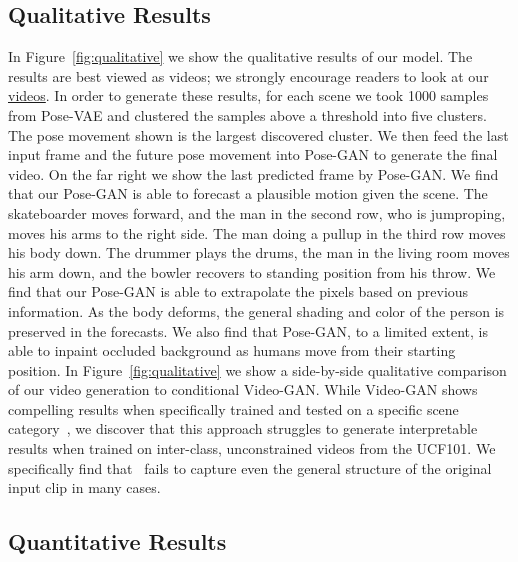 \subsection{Qualitative Results}
In Figure~\ref{fig:qualitative} we show the qualitative results of our model. The results are best viewed as videos; we strongly encourage readers to look at our \href{http://www.cs.cmu.edu/~jcwalker/POS/POS.html}{videos}. In order to generate these results, for each scene we took 1000 samples from Pose-VAE and clustered the samples above a threshold into five clusters. The pose movement shown is the largest discovered cluster. We then feed the last input frame and the future pose movement into Pose-GAN to generate the final video. On the far right we show the last predicted frame by Pose-GAN. We find that our Pose-GAN is able to forecast a plausible motion given the scene. The skateboarder moves forward, and the man in the second row, who is jumproping, moves his arms to the right side. The man doing a pullup in the third row moves his body down. The drummer plays the drums, the man in the living room moves his arm down, and the bowler recovers to standing position from his throw. We find that our Pose-GAN is able to extrapolate the pixels based on previous information. As the body deforms, the general shading and color of the person is preserved in the forecasts. We also find that Pose-GAN, to a limited extent, is able to inpaint occluded background as humans move from their starting position. In Figure~\ref{fig:qualitative} we show a side-by-side qualitative comparison of our video generation to conditional Video-GAN. While Video-GAN shows compelling results when specifically trained and tested on a specific scene category~\cite{Vondrick16}, we discover that this approach struggles to generate interpretable results when trained on inter-class, unconstrained videos from the UCF101. We specifically find that~\cite{Vondrick16} fails to capture even the general structure of the original input clip in many cases. 

\subsection{Quantitative Results}

